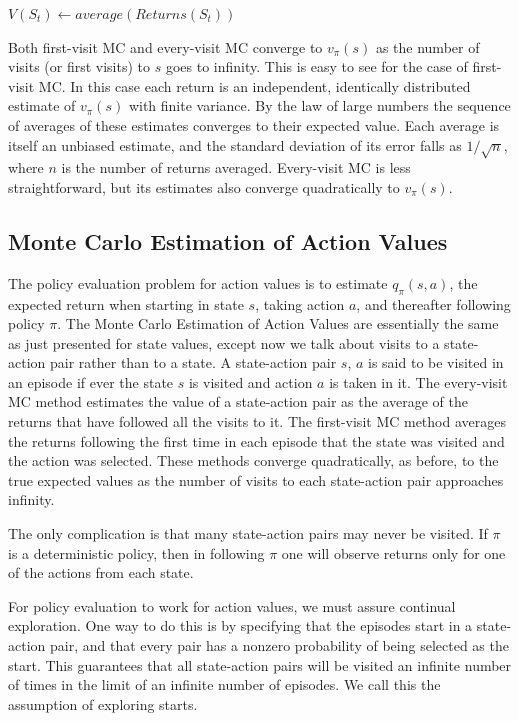 \documentclass{article}
\begin{document}
\hspace{1.5cm} \(V(S_t) \leftarrow average(Returns(S_t))\)

Both first-visit MC and every-visit MC converge to \(v_{\pi}(s)\) as the number of visits (or first visits) to \(s\) goes to infinity. 
This is easy to see for the case of first-visit MC. In this case each return is an independent, identically distributed estimate of \(v_{\pi}(s)\) with finite variance. 
By the law of large numbers the sequence of averages of these estimates converges to their expected value. Each average is itself an unbiased estimate, 
and the standard deviation of its error falls as \(1 / \sqrt{n}\), where \(n\) is the number of returns averaged. Every-visit MC is less straightforward, 
but its estimates also converge quadratically to \(v_{\pi}(s)\).

\subsection{Monte Carlo Estimation of Action Values}

The policy evaluation problem for action values is to estimate \(q_{\pi}(s, a)\), the expected return when starting in state \(s\), taking action \(a\), 
and thereafter following policy \(\pi\). The Monte Carlo Estimation of Action Values are essentially the same as just presented for state values, except now we talk about visits to a state-action pair rather than to a state. 
A state-action pair \(s\), \(a\) is said to be visited in an episode if ever the state \(s\) is visited and action \(a\) is taken in it. 
The every-visit MC method estimates the value of a state-action pair as the average of the returns that have followed all the visits to it. 
The first-visit MC method averages the returns following the first time in each episode that the state was visited and the action was selected. 
These methods converge quadratically, as before, to the true expected values as the number of visits to each state-action pair approaches infinity.

The only complication is that many state-action pairs may never be visited. If \(\pi\) is a deterministic policy, then in following \(\pi\) one will observe returns only for one of the actions from each state.

For policy evaluation to work for action values, we must assure continual exploration. One way to do this is by specifying that the episodes start in a state-action pair, 
and that every pair has a nonzero probability of being selected as the start. This guarantees that all state-action pairs will be visited an infinite number of times in the limit of an infinite number of episodes. 
We call this the assumption of exploring starts.
\end{document}
